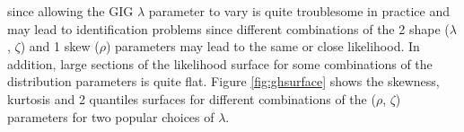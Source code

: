 since allowing the GIG $\lambda$ parameter to vary is quite troublesome in practice
and may lead to identification problems since different combinations of the 2 shape
($\lambda$, $\zeta$) and 1 skew ($\rho$) parameters may lead to the same or close
likelihood. In addition, large sections of the likelihood surface for some combinations
of the distribution parameters is quite flat. Figure \ref{fig:ghsurface} shows the skewness,
kurtosis and 2 quantiles surfaces for different combinations of the ($\rho$, $\zeta$)
parameters for two popular choices of $\lambda$.
\begin{landscape}
\begin{figure}[!ht]
\centering
{}

\end{figure}
\end{landscape}
